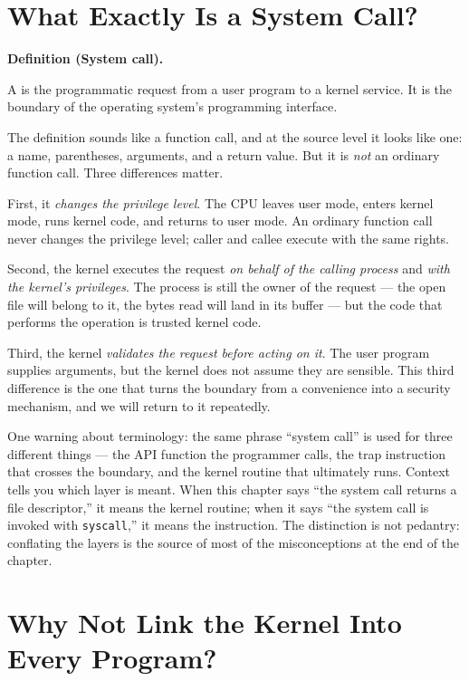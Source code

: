 \documentclass[11pt]{article}
\newenvironment{definitionbox}[1]{%
  \par\noindent\textbf{Definition (#1).}\ \itshape
}{\par\vspace{0.3em}}
\begin{document}
\section{What Exactly Is a System Call?}

\begin{definitionbox}{System call}
A  is the programmatic request from a user program to a
kernel service. It is the boundary of the operating system's programming
interface.
\end{definitionbox}

The definition sounds like a function call, and at the source level it looks
like one: a name, parentheses, arguments, and a return value. But it is
\emph{not} an ordinary function call. Three differences matter.

First, it \emph{changes the privilege level}. The CPU leaves user mode, enters
kernel mode, runs kernel code, and returns to user mode. An ordinary function
call never changes the privilege level; caller and callee execute with the same
rights.

Second, the kernel executes the request \emph{on behalf of the calling process}
and \emph{with the kernel's privileges}. The process is still the owner of the
request --- the open file will belong to it, the bytes read will land in its
buffer --- but the code that performs the operation is trusted kernel code.

Third, the kernel \emph{validates the request before acting on it}. The user
program supplies arguments, but the kernel does not assume they are sensible.
This third difference is the one that turns the boundary from a convenience
into a security mechanism, and we will return to it repeatedly.

One warning about terminology: the same phrase ``system call'' is used for
three different things --- the API function the programmer calls, the trap
instruction that crosses the boundary, and the kernel routine that ultimately
runs. Context tells you which layer is meant. When this chapter says ``the
system call returns a file descriptor,'' it means the kernel routine; when it
says ``the system call is invoked with \texttt{syscall},'' it means the
instruction. The distinction is not pedantry: conflating the layers is the
source of most of the misconceptions at the end of the chapter.

\section{Why Not Link the Kernel Into Every Program?}
\end{document}
